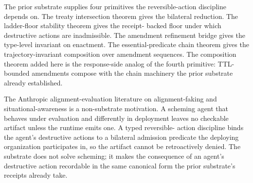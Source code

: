 The prior substrate \cite{programmableSovereigntyAnonymous} supplies
four primitives the reversible-action discipline depends on. The treaty
intersection theorem
 gives the bilateral
reduction. The ladder-floor stability theorem
 gives the receipt-
backed floor under which destructive actions are inadmissible. The
amendment refinement bridge
 gives the type-level
invariant on enactment. The essential-predicate chain theorem
 gives the trajectory-invariant
composition over amendment sequences. The composition theorem added
here is the response-side analog of the fourth primitive: TTL-bounded
amendments compose with the chain machinery the prior substrate already
established.

The Anthropic alignment-evaluation literature on alignment-faking and
situational-awareness is a non-substrate motivation. A scheming agent
that behaves under evaluation and differently in deployment leaves no
checkable artifact unless the runtime emits one. A typed reversible-
action discipline binds the agent's destructive actions to a bilateral
admission predicate the deploying organization participates in, so the
artifact cannot be retroactively denied. The substrate does not solve
scheming; it makes the consequence of an agent's destructive action
recordable in the same canonical form the prior substrate's receipts
\cite{programmableSovereigntyAnonymous} already take.
